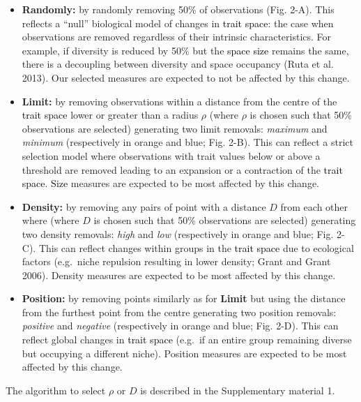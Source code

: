 \documentclass[]{article}
\begin{document}
\begin{itemize}
\item
  \textbf{Randomly:} by randomly removing 50\% of observations (Fig.
  2-A). This reflects a ``null'' biological model of changes in
  \textcolor{black}{trait space}: the case when observations
  are removed regardless of their intrinsic characteristics. For
  example, if diversity is reduced by 50\% but the
  \textcolor{black}{space size} remains the same, there is a
  decoupling between diversity and space occupancy (Ruta et al. 2013).
  Our selected measures are expected to not be affected by this change.
\item
  \textbf{Limit:} by removing observations within a distance from the
  centre of the \textcolor{black}{trait space} lower or
  greater than a radius \(\rho\) (where \(\rho\) is chosen such that
  50\% observations are selected) generating two limit removals:
  \emph{maximum} and \emph{minimum} (respectively in orange and blue;
  Fig. 2-B). This can reflect a strict selection model where
  observations with trait values below or above a threshold are removed
  leading to an expansion or a contraction of the
  \textcolor{black}{trait space}.
  \textcolor{black}{Size} measures are expected to be most
  affected by this change.
\item
  \textbf{Density:} by removing any pairs of point with a distance \(D\)
  from each other where (where \(D\) is chosen such that 50\%
  observations are selected) generating two density removals:
  \emph{high} and \emph{low} (respectively in orange and blue; Fig.
  2-C). This can reflect changes within groups in the
  \textcolor{black}{trait space} due to ecological factors
  (e.g.~niche repulsion resulting in lower density; Grant and Grant
  2006). Density measures are expected to be most affected by this
  change.
\item
  \textbf{Position:} by removing points similarly as for \textbf{Limit}
  but using the distance from the furthest point from the centre
  generating two position removals: \emph{positive} and \emph{negative}
  (respectively in orange and blue; Fig. 2-D). This can reflect global
  changes in \textcolor{black}{trait space} (e.g.~if an
  entire group remaining diverse but occupying a different niche).
  Position measures are expected to be most affected by this change.
\end{itemize}

The algorithm to select \(\rho\) or \(D\) is described in the
Supplementary material 1.
\end{document}
